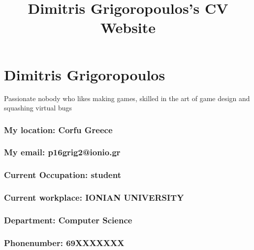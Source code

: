 \documentclass[]{article}
\title{Dimitris Grigoropoulos's CV Website}
\date{}
\begin{document}
\maketitle

\hypertarget{dimitris-grigoropoulos}{%
\section{Dimitris Grigoropoulos}\label{dimitris-grigoropoulos}}

Passionate nobody who likes making games, skilled in the art of game
design and squashing virtual bugs

\hypertarget{my-location-corfu-greece}{%
\subsubsection{My location: Corfu
Greece}\label{my-location-corfu-greece}}

\hypertarget{my-email-p16grig2ionio.gr}{%
\subsubsection{My email:
p16grig2@ionio.gr}\label{my-email-p16grig2ionio.gr}}

\hypertarget{current-occupation-student}{%
\subsubsection{Current Occupation:
student}\label{current-occupation-student}}

\hypertarget{current-workplace-ionian-university}{%
\subsubsection{Current workplace: IONIAN
UNIVERSITY}\label{current-workplace-ionian-university}}

\hypertarget{department-computer-science}{%
\subsubsection{Department: Computer
Science}\label{department-computer-science}}

\hypertarget{phonenumber-69xxxxxxx}{%
\subsubsection{Phonenumber: 69XXXXXXX}\label{phonenumber-69xxxxxxx}}
\end{document}
